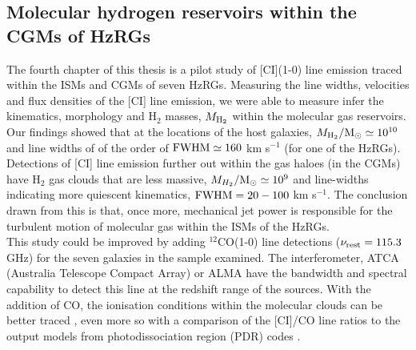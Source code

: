\subsection{Molecular hydrogen reservoirs within the CGMs of HzRGs}

The fourth chapter of this thesis is a pilot study of [CI](1-0) line emission traced within the ISMs and CGMs of seven HzRGs. Measuring the line widths, velocities and flux densities of the [CI] line emission, we were able to measure infer the kinematics, morphology and H$_2$ masses, $M_{\rm H_2}$ within the molecular gas reservoirs. Our findings showed that at the locations of the host galaxies, $M_{\rm H_2}/\rm{M}_\odot \simeq 10^{10}$ and line widths of of the order of $\rm FWHM \simeq 160$ km s$^{-1}$ (for one of the HzRGs). Detections of [CI] line emission further out within the gas haloes (in the CGMs) have H$_2$ gas clouds that are less massive, $M_{H_2}/\rm{M}_\odot \simeq 10^9$ and line-widths indicating more quiescent kinematics, $\rm FWHM=20 - 100$ km s$^{-1}.$ The conclusion drawn from this is that, once more, mechanical jet power is responsible for the turbulent motion of molecular gas within the ISMs of the HzRGs. \\

This study could be improved by adding $^{12}$CO(1-0) line detections ($\nu_{\rm rest} =115.3$ GHz) for the seven galaxies in the sample examined. The interferometer, ATCA (Australia Telescope Compact Array) or ALMA have the bandwidth and spectral capability to detect this line at the redshift range of the sources. With the addition of CO, the ionisation conditions within the molecular clouds can be better traced \citep{Gullberg2016b,Emonts2018,Papadopoulos2018}, even more so with a comparison of the [CI]/CO line ratios to the output models from photodissociation region (PDR) codes \citep{Bothwell2017}. 